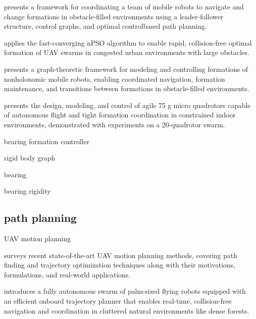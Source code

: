 \cite{desai1999control} presents a framework for coordinating a team of mobile robots to navigate and change formations in obstacle-filled environments using a leader-follower structure, control graphs, and optimal control\-based path planning.

\cite{spanogianopoulos2017fast} applies the fast-converging nPSO algorithm to enable rapid, collision-free optimal formation of UAV swarms in congested urban environments with large obstacles.

\cite{desai2002modeling} presents a graph-theoretic framework for modeling and controlling formations of nonholonomic mobile robots, enabling coordinated navigation, formation maintenance, and transitions between formations in obstacle-filled environments.

\cite{kushleyev2013towards} presents the design, modeling, and control of agile 75 g micro quadrotors capable of autonomous flight and tight formation coordination in constrained indoor environments, demonstrated with experiments on a 20-quadrotor swarm.


\cite{schiano2016rigidity} bearing formation controller

rigid body graph
\cite{yang2018growing}
\cite{mehdifar2018finite}

bearing
\cite{zhao2015translational}
\cite{zhao2015bearing}
\cite{li2020adaptive}
\cite{li2021adaptive}
\cite{li2020bearing}
\cite{zhao2021finite}
\cite{zhang2022distributed}
\cite{zhang2023bearing}
\cite{arrigoni2018bearing}
\cite{zhao2019bearing}
\cite{trinh2018bearing}
\cite{trinh2021finite}

bearing rigidity
\cite{tay1985generating}
\cite{eren2012formation}
\cite{trinh2019minimal}
\cite{karimian2017theory}
\cite{hou2016elementary}
\cite{carboni2014rigidity}


\subsection{path planning}

UAV motion planning

\cite{quan2020survey} surveys recent state-of-the-art UAV motion planning methods, covering path finding and trajectory optimization techniques along with their motivations, formulations, and real-world applications.

\cite{zhou2022swarm} introduces a fully autonomous swarm of palm-sized flying robots equipped with an efficient onboard trajectory planner that enables real-time, collision-free navigation and coordination in cluttered natural environments like dense forests.

